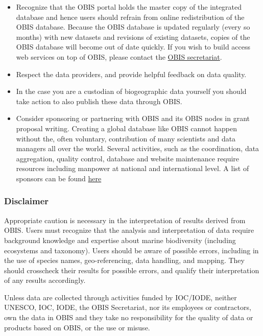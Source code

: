 \documentclass[
  letterpaper,
  DIV=11,
  numbers=noendperiod,
  oneside]{scrreprt}
\providecommand{\tightlist}{%
  \setlength{\itemsep}{0pt}\setlength{\parskip}{0pt}}\usepackage{longtable,booktabs,array}
\begin{document}
\begin{itemize}
\tightlist
\item
  Recognize that the OBIS portal holds the master copy of the integrated
  database and hence users should refrain from online redistribution of
  the OBIS database. Because the OBIS database is updated regularly
  (every so months) with new datasets and revisions of existing
  datasets, copies of the OBIS database will become out of date quickly.
  If you wish to build access web services on top of OBIS, please
  contact the \href{https://obis.org/contact/}{OBIS secretariat}.
\item
  Respect the data providers, and provide helpful feedback on data
  quality.
\item
  In the case you are a custodian of biogeographic data yourself you
  should take action to also publish these data through OBIS.
\item
  Consider sponsoring or partnering with OBIS and its OBIS nodes in
  grant proposal writing. Creating a global database like OBIS cannot
  happen without the, often voluntary, contribution of many scientists
  and data managers all over the world. Several activities, such as the
  coordination, data aggregation, quality control, database and website
  maintenance require resources including manpower at national and
  international level. A list of sponsors can be found
  \href{https://obis.org/about/sponsor/}{here}
\end{itemize}

\hypertarget{disclaimer}{%
\subsubsection{Disclaimer}\label{disclaimer}}

Appropriate caution is necessary in the interpretation of results
derived from OBIS. Users must recognize that the analysis and
interpretation of data require background knowledge and expertise about
marine biodiversity (including ecosystems and taxonomy). Users should be
aware of possible errors, including in the use of species names,
geo-referencing, data handling, and mapping. They should crosscheck
their results for possible errors, and qualify their interpretation of
any results accordingly.

Unless data are collected through activities funded by IOC/IODE, neither
UNESCO, IOC, IODE, the OBIS Secretariat, nor its employees or
contractors, own the data in OBIS and they take no responsibility for
the quality of data or products based on OBIS, or the use or misuse.
\end{document}
